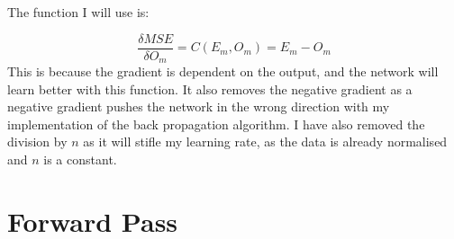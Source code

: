 \documentclass{report}
\begin{document}
The function I will use is:

\begin{equation}
    \frac{\delta MSE}{\delta O_m}  = C(E_m, O_m) = E_m - O_m
\end{equation}
This is because the gradient is dependent on the output, and the network will learn better with this function.
It also removes the negative gradient as a negative gradient pushes the network in the wrong direction with my implementation of the back propagation algorithm.
I have also removed the division by $n$ as it will stifle my learning rate, as the data is already normalised and $n$ is a constant.

\section{Forward Pass}
\end{document}
